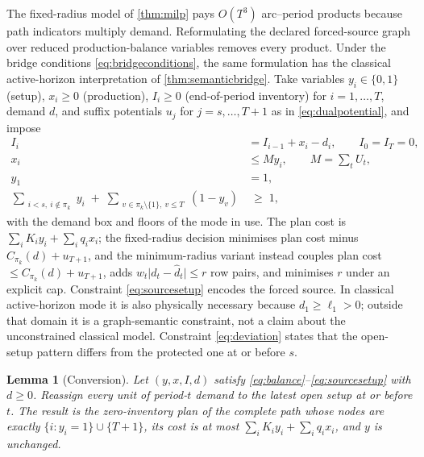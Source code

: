 \documentclass[11pt]{article}
\newtheorem{lemma}[theorem]{Lemma}
\theoremstyle{definition}
\newcommand{\dhat}{\widehat d}
\begin{document}
The fixed-radius model of \cref{thm:milp} pays $O(T^3)$ arc--period
products because path indicators multiply demand. Reformulating the declared
forced-source graph over reduced production-balance variables removes every
product. Under the bridge conditions \eqref{eq:bridgeconditions}, the same
formulation has the classical active-horizon interpretation of
\cref{thm:semanticbridge}. Take
variables $y_i\in\{0,1\}$ (setup), $x_i\ge0$ (production),
$I_i\ge0$ (end-of-period inventory) for $i=1,\ldots,T$, demand $d$, and
suffix potentials $u_j$ for $j=s,\ldots,T+1$ as in
\eqref{eq:dualpotential}, and impose
\begin{align}
I_i&=I_{i-1}+x_i-d_i,\qquad I_0=I_T=0,\label{eq:balance}\\
x_i&\le M y_i,\qquad M=\textstyle\sum_t U_t,\label{eq:vub}\\
y_1&=1,\label{eq:sourcesetup}\\
\sum_{\substack{i<s,\ i\notin\pi_k}} y_i
\;+\;
\sum_{\substack{v\in\pi_k\setminus\{1\},\ v\le T}}(1-y_v)
&\;\ge\;1,\label{eq:deviation}
\end{align}
with the demand box and floors of the mode in use. The plan cost is
$\sum_iK_iy_i+\sum_iq_ix_i$; the fixed-radius decision minimises plan
cost minus $C_{\pi_k}(d)+u_{T+1}$, and the minimum-radius variant instead
couples plan cost $\le C_{\pi_k}(d)+u_{T+1}$, adds
$w_t\lvert d_t-\dhat_t\rvert\le r$ row pairs, and minimises $r$ under an
explicit cap. Constraint \eqref{eq:sourcesetup} encodes the forced source. In classical
active-horizon mode it is also physically necessary because
$d_1\ge\ell_1>0$; outside that domain it is a graph-semantic constraint, not
a claim about the unconstrained classical model. Constraint
\eqref{eq:deviation} states that the open-setup pattern differs from the
protected one at or before $s$.

\begin{lemma}[Conversion]\label{lem:conversion}
Let $(y,x,I,d)$ satisfy \eqref{eq:balance}--\eqref{eq:sourcesetup} with
$d\ge0$. Reassign every unit of period-$t$ demand to the \emph{latest}
open setup at or before $t$. The result is the zero-inventory plan of the
complete path whose nodes are exactly $\{i:y_i=1\}\cup\{T+1\}$, its cost
is at most $\sum_iK_iy_i+\sum_iq_ix_i$, and $y$ is unchanged.
\end{lemma}
\end{document}
